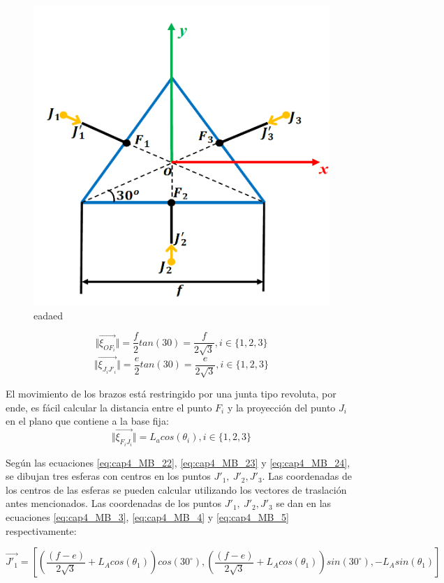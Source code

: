             \begin{figure}[htb]
                 \centering
               \includegraphics[width=0.45\linewidth]{Main/Chapter4/Images4/DIBUJO29.png}
               \caption{eadaed}
               \label{f:cap4_mb_cineposdirect}
            \end{figure}
            
    \begin{equation}
        \Vert \overrightarrow{\xi_{OF_i}} \Vert=\frac{f}{2}tan(30)=\frac{f}{2\sqrt{3}} , i \in \{1,2,3\}
    \end{equation}
    \begin{equation}
        \Vert \overrightarrow{\xi_{J_iJ'_i}} \Vert=\frac{e}{2}tan(30)=\frac{e}{2\sqrt{3}} , i \in \{1,2,3\}
    \end{equation}
    
        \newpage

    El movimiento de los brazos está restringido por una junta tipo revoluta, por ende, es fácil calcular la distancia entre el punto $F_i$ y la proyección del punto $J_i$ en el plano que contiene a la base fija:
    \begin{equation}
        \Vert \overrightarrow{\xi_{F_iJ_i}} \Vert=L_a cos(\theta_i) , i \in \{1,2,3\}
    \end{equation}
    
    Según las ecuaciones \ref{eq:cap4_MB_22}, \ref{eq:cap4_MB_23} y \ref{eq:cap4_MB_24}, se dibujan tres esferas con centros en los puntos \( J'_{1},~J'_{2},J'_{3} \). Las coordenadas de los centros de las esferas se pueden calcular utilizando los vectores de traslación antes mencionados. Las coordenadas de los puntos \( J'_{1},~J'_{2},J'_{3} \) se dan en las ecuaciones \ref{eq:cap4_MB_3}, \ref{eq:cap4_MB_4} y \ref{eq:cap4_MB_5} respectivamente:

  
          \begin{equation}
                \overrightarrow{J'_{1}}= \left [\left( \frac{(f-e)}{2\sqrt{3}}+{L}_{A}cos(\theta_1)\right) cos(30^\circ), \left(\frac{(f-e)}{2\sqrt{3}} + {L}_{A}cos(\theta_1)\right) sin(30^\circ), -L_{A}sin(\theta_1)\right]
        \label{eq:cap4_MB_3}
        \end{equation}    
        
